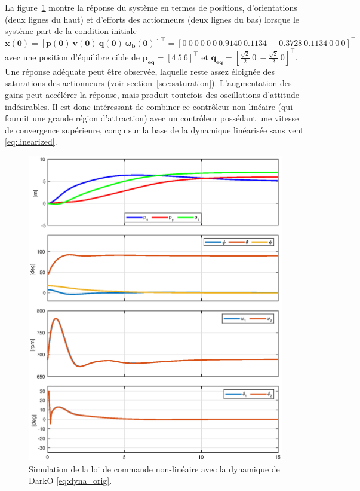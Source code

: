 La figure~\ref{fig_global_contol} montre la réponse du système en termes de positions, d'orientations (deux lignes du haut) et d'efforts des actionneurs (deux lignes du bas) lorsque le système part de la condition initiale $\boldsymbol{x(0)} = [\boldsymbol{p(0)}~ \boldsymbol{v(0)}~ \boldsymbol{q(0)}~ \boldsymbol{\omega_b(0)}]^\top = [0~0~0 ~ 0~0~0 ~0. 9140 ~0.1134~ -0.3728~ 0. 1134~ 0~ 0~ 0]^\top $ avec une position d'équilibre cible de $\boldsymbol{p_{\text{eq}}} = [4~5~6]^\top$ et $\boldsymbol{q_{\text{eq}}} = [\frac{\sqrt{2}}{2}~0~-\frac{\sqrt{2}}{2}~0]^\top$. 
Une réponse adéquate peut être observée, laquelle reste assez éloignée des saturations des actionneurs (voir section~\ref{sec:saturation}). L'augmentation des gains peut accélérer la réponse, mais produit toutefois des oscillations d'attitude indésirables. Il est donc intéressant de combiner ce contrôleur non-linéaire (qui fournit une grande région d'attraction) avec un contrôleur possédant une vitesse de convergence supérieure, conçu sur la base de la dynamique linéarisée sans vent \eqref{eq:linearized}.


\begin{figure}[ht!]
    \centering
    \includegraphics[trim=0cm 0.6cm 0cm 0.6cm,clip,width=0.8\columnwidth]{figures/global2.eps}
    \caption{Simulation de la loi de commande non-linéaire avec la dynamique de DarkO \eqref{eq:dyna_orig}.}
    \label{fig_global_contol}
\end{figure}


